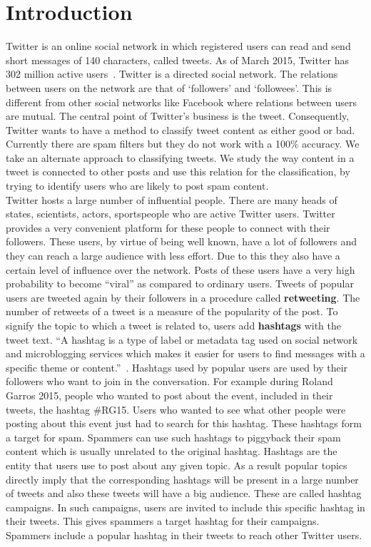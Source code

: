 \documentclass[journal, a4paper, 12pt]{article}
\begin{document}
\section{Introduction}
Twitter is an online social network in which registered users can read and send short messages of 140 characters, called tweets. As of March 2015, Twitter has 302 million active users~\cite{twitter_stats}. Twitter is a directed social network. The relations between users on the network are that of ‘followers’ and ‘followees’. This is different from other social networks like Facebook where relations between users are mutual. The central point of Twitter's business is the tweet. Consequently, Twitter wants to have a method to classify tweet content as either good or bad. Currently there are spam filters but they do not work with a 100\% accuracy.  We take an alternate approach to classifying tweets. We study the way content in a tweet is connected to other posts and use this relation for the classification, by trying to identify users who are likely to post spam content. \\
    
Twitter hosts a large number of influential people. There are many heads of states, scientists, actors, sportspeople who are active Twitter users. Twitter provides a very convenient platform for these people to connect with their followers. These users, by virtue of being well known, have a lot of followers and they can reach a large audience with less effort. Due to this they also have a certain level of influence over the network. Posts of these users have a very high probability to become ``viral'' as compared to ordinary users. Tweets of popular users are tweeted again by their followers in a procedure called \textbf{retweeting}. The number of retweets of a tweet is a measure of the popularity of the post. To signify the topic to which a tweet is related to, users add \textbf{hashtags} with the tweet text. ``A hashtag is a type of label or metadata tag used on social network and microblogging services which makes it easier for users to find messages with a specific theme or content.''~\cite{wikihashtag}. Hashtags used by popular users are used by their followers who want to join in the conversation. For example during Roland Garros 2015, people who wanted to post about the event, included in their tweets, the hashtag \#RG15. Users who wanted to see what other people were posting about this event just had to search for this hashtag. These hashtags form a target for spam. Spammers can use such hashtags to piggyback their spam content which is usually unrelated to the original hashtag. Hashtags are the entity that users use to post about any given topic. As a result popular topics directly imply that the corresponding hashtags will be present in a large number of tweets and also these tweets will have a big audience. These are called hashtag campaigns. In such campaigns, users are invited to include this specific hashtag in their tweets. This gives spammers a target hashtag for their campaigns. Spammers include a popular hashtag in their tweets to reach other Twitter users. \\
\end{document}
